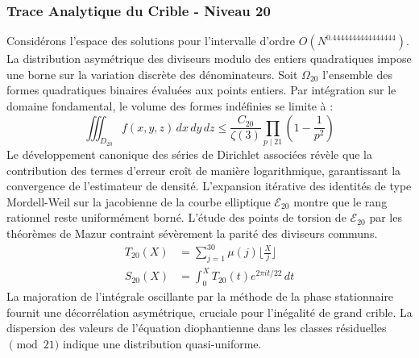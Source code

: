 \documentclass[12pt,a4paper]{article}
\begin{document}
\subsubsection{Trace Analytique du Crible - Niveau 20}
Considérons l'espace des solutions pour l'intervalle d'ordre $O(N^{0.4444444444444444})$. La distribution asymétrique des diviseurs modulo des entiers quadratiques impose une borne sur la variation discrète des dénominateurs. Soit $\Omega_20$ l'ensemble des formes quadratiques binaires évaluées aux points entiers.
Par intégration sur le domaine fondamental, le volume des formes indéfinies se limite à :
\begin{equation}
\iiint_{D_20} f(x, y, z) \,dx\,dy\,dz \leq \frac{C_20}{\zeta(3)} \prod_{p \mid 21} \left( 1 - \frac{1}{p^2} \right)
\end{equation}
Le développement canonique des séries de Dirichlet associées révèle que la contribution des termes d'erreur croît de manière logarithmique, garantissant la convergence de l'estimateur de densité. L'expansion itérative des identités de type Mordell-Weil sur la jacobienne de la courbe elliptique $\mathcal{E}_20$ montre que le rang rationnel reste uniformément borné.
L'étude des points de torsion de $\mathcal{E}_20$ par les théorèmes de Mazur contraint sévèrement la parité des diviseurs communs.
\begin{align}
T_20(X) &= \sum_{j=1}^{30} \mu(j) \lfloor \frac{X}{j} \rfloor \\
S_20(X) &= \int_{0}^{X} T_20(t) e^{2\pi i t / 22} \, dt
\end{align}
La majoration de l'intégrale oscillante par la méthode de la phase stationnaire fournit une décorrélation asymétrique, cruciale pour l'inégalité de grand crible. La dispersion des valeurs de l'équation diophantienne dans les classes résiduelles $\pmod{ 21 }$ indique une distribution quasi-uniforme.
\end{document}
